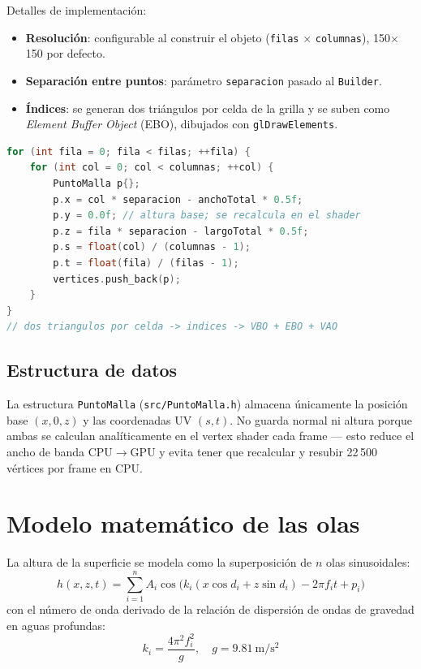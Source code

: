 \documentclass[11pt]{article}
\begin{document}
Detalles de implementación:
\begin{itemize}
    \item \textbf{Resolución}: configurable al construir el objeto
    (\texttt{filas} $\times$ \texttt{columnas}), 150$\times$150 por defecto.
    \item \textbf{Separación entre puntos}: parámetro \texttt{separacion}
    pasado al \texttt{Builder}.
    \item \textbf{Índices}: se generan dos triángulos por celda de la
    grilla y se suben como \emph{Element Buffer Object} (EBO), dibujados
    con \texttt{glDrawElements}.
\end{itemize}

\begin{lstlisting}[language=C,caption={Generación de vértices e índices en Oceano::construirMalla}]
for (int fila = 0; fila < filas; ++fila) {
    for (int col = 0; col < columnas; ++col) {
        PuntoMalla p{};
        p.x = col * separacion - anchoTotal * 0.5f;
        p.y = 0.0f; // altura base; se recalcula en el shader
        p.z = fila * separacion - largoTotal * 0.5f;
        p.s = float(col) / (columnas - 1);
        p.t = float(fila) / (filas - 1);
        vertices.push_back(p);
    }
}
// dos triangulos por celda -> indices -> VBO + EBO + VAO
\end{lstlisting}

\subsection{Estructura de datos}
La estructura \texttt{PuntoMalla} (\texttt{src/PuntoMalla.h}) almacena
únicamente la posición base $(x,0,z)$ y las coordenadas UV $(s,t)$. No
guarda normal ni altura porque ambas se calculan analíticamente en el
vertex shader cada frame — esto reduce el ancho de banda CPU$\to$GPU y
evita tener que recalcular y resubir 22\,500 vértices por frame en CPU.

\section{Modelo matemático de las olas}
La altura de la superficie se modela como la superposición de $n$ olas
sinusoidales:
\begin{equation}
    h(x, z, t) = \sum_{i=1}^{n} A_i \cos\big(k_i (x\cos d_i + z\sin d_i) - 2\pi f_i t + p_i\big)
\end{equation}
con el número de onda derivado de la relación de dispersión de ondas de
gravedad en aguas profundas:
\begin{equation}
    k_i = \frac{4\pi^2 f_i^2}{g},\quad g = 9.81\ \mathrm{m/s^2}
\end{equation}
\end{document}
